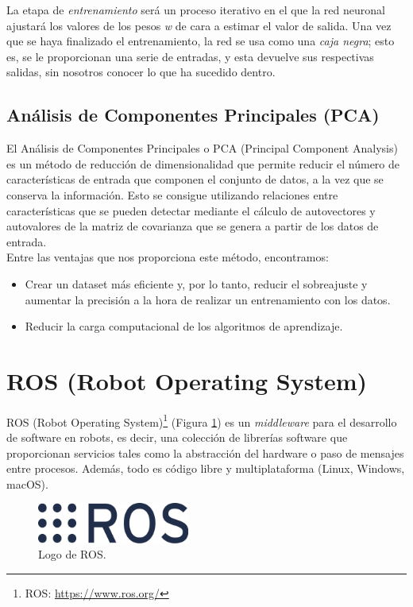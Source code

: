 La etapa de \textit{entrenamiento} será un proceso iterativo en el que la red neuronal ajustará los valores de los pesos \textit{w} de cara a estimar el valor de salida.  Una vez que se haya finalizado el entrenamiento, la red se usa como una \textit{caja negra}; esto es, se le proporcionan una serie de entradas, y esta devuelve sus respectivas salidas, sin nosotros conocer lo que ha sucedido dentro.

\subsection{Análisis de Componentes Principales (PCA)}

El Análisis de Componentes Principales o PCA (Principal Component Analysis) es un método de reducción de dimensionalidad que permite reducir el número de características de entrada que componen el conjunto de datos, a la vez que se conserva la información. Esto se consigue utilizando relaciones entre características que se pueden detectar mediante el cálculo de autovectores y autovalores de la matriz de covarianza que se genera a partir de los datos de entrada.\\

\noindent
Entre las ventajas que nos proporciona este método, encontramos:

\begin{itemize}
    \item Crear un dataset más eficiente y, por lo tanto, reducir el sobreajuste y aumentar la precisión a la hora de realizar un entrenamiento con los datos.
    
    \item Reducir la carga computacional de los algoritmos de aprendizaje.
\end{itemize}

\section{ROS (Robot Operating System)}

ROS (Robot Operating System)\footnote{ROS: \url{https://www.ros.org/}} (Figura \ref{fig:logo_ros}) es un \textit{middleware} para el desarrollo de software en robots, es decir, una colección de librerías software que proporcionan servicios tales como la abstracción del hardware o paso de mensajes entre procesos. Además, todo es código libre y multiplataforma (Linux, Windows, macOS).\\

\begin{figure} [h!]
  \begin{center}
    \includegraphics[width=5cm]{figs/ros_logo.png}
  \end{center}
  \captionsetup{justification=centering}
  \caption{Logo de ROS.}
  \label{fig:logo_ros}
\end{figure}

